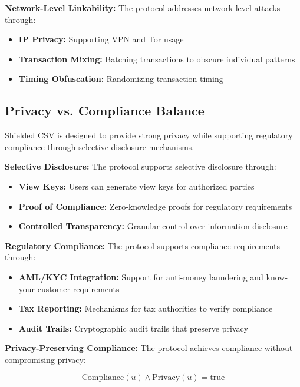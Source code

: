 \documentclass[11pt,a4paper]{article}
\begin{document}
\textbf{Network-Level Linkability:}
The protocol addresses network-level attacks through:

\begin{itemize}
    \item \textbf{IP Privacy:} Supporting VPN and Tor usage
    \item \textbf{Transaction Mixing:} Batching transactions to obscure individual patterns
    \item \textbf{Timing Obfuscation:} Randomizing transaction timing
\end{itemize}

\subsection{Privacy vs. Compliance Balance}

Shielded CSV is designed to provide strong privacy while supporting regulatory compliance through selective disclosure mechanisms.

\textbf{Selective Disclosure:}
The protocol supports selective disclosure through:

\begin{itemize}
    \item \textbf{View Keys:} Users can generate view keys for authorized parties
    \item \textbf{Proof of Compliance:} Zero-knowledge proofs for regulatory requirements
    \item \textbf{Controlled Transparency:} Granular control over information disclosure
\end{itemize}

\textbf{Regulatory Compliance:}
The protocol supports compliance requirements through:

\begin{itemize}
    \item \textbf{AML/KYC Integration:} Support for anti-money laundering and know-your-customer requirements
    \item \textbf{Tax Reporting:} Mechanisms for tax authorities to verify compliance
    \item \textbf{Audit Trails:} Cryptographic audit trails that preserve privacy
\end{itemize}

\textbf{Privacy-Preserving Compliance:}
The protocol achieves compliance without compromising privacy:

\begin{equation}
\text{Compliance}(u) \land \text{Privacy}(u) = \text{true}
\end{equation}
\end{document}
